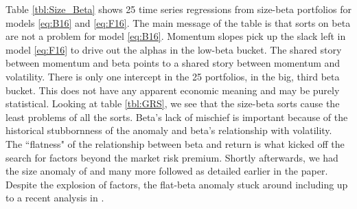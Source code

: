 
Table \ref{tbl:Size_Beta} shows 25 time series regressions from size-beta
portfolios for models \ref{eq:B16} and \ref{eq:F16}. The main message of the
table is that sorts on beta are not a problem for model \ref{eq:B16}. Momentum
slopes pick up the slack left in model \ref{eq:F16} to drive out the alphas in
the low-beta bucket. The shared story between momentum and beta points to a
shared story between momentum and volatility. There is only one intercept in
the 25 portfolios, in the big, third beta bucket. This does not have any
apparent economic meaning and may be purely statistical. Looking at table
\ref{tbl:GRS}, we see that the size-beta sorts cause the least problems of all
the sorts. Beta's lack of mischief is important because of the historical
stubbornness of the anomaly and beta's relationship with volatility. The
``flatness" of the relationship between beta and return
\parencite{jensen1972capital} is what kicked off the search for factors beyond
the market risk premium. Shortly afterwards, we had the size anomaly of
\textcite{banz1981relationship} and many more followed as detailed earlier in
the paper. Despite the explosion of factors, the flat-beta anomaly stuck around
including up to a recent analysis in \textcite{fama2016dissecting}.


